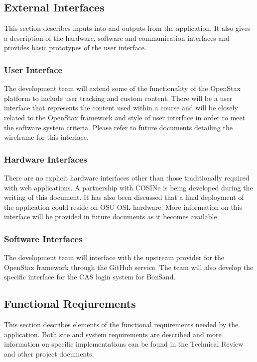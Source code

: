 \documentclass[onecolumn, draftclsnofoot,10pt, compsoc]{IEEEtran}
\begin{document}
\subsection{External Interfaces}
This section describes inputs into and outputs from the application. It also gives a description of the hardware, software and communication interfaces and provides basic prototypes of the user interface.

\subsubsection{User Interface}
The development team will extend some of the functionality of the OpenStax platform to include user tracking and custom content. There will be a user interface that represents the content used within a course and will be closely related to the OpenStax framework and style of user interface in order to meet the software system criteria. Please refer to future documents detailing the wireframe for this interface.

\subsubsection{Hardware Interfaces}
There are no explicit hardware interfaces other than those traditionally required with web applications. A partnership with COSINe is being developed during the writing of this document. It has also been discussed that a final deployment of the application could reside on OSU OSL hardware. More information on this interface will be provided in future documents as it becomes available.  

\subsubsection{Software Interfaces}
The development team will interface with the upstream provider for the OpenStax framework through the GitHub service. The team will also develop the specific interface for the CAS login system for BoxSand.

\subsection{Functional Reqiurements}
This section describes elements of the functional requirements needed by the application. Both site and system requirements are described and more information on specific implementations can be found in the Technical Review and other project documents. 
\end{document}
